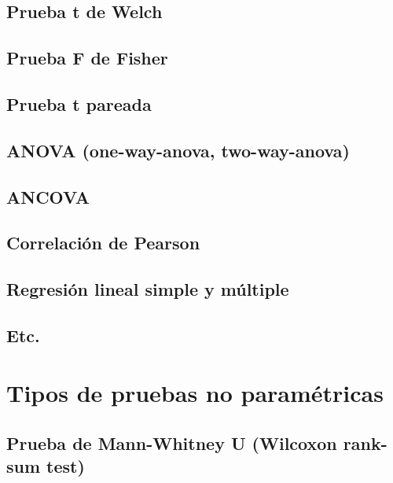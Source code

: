 \documentclass[
]{book}
\begin{document}
\section{Prueba t de Welch}\label{prueba-t-de-welch}

\section{Prueba F de Fisher}\label{prueba-f-de-fisher}

\section{Prueba t pareada}\label{prueba-t-pareada}

\section{ANOVA (one-way-anova, two-way-anova)}\label{anova-one-way-anova-two-way-anova}

\section{ANCOVA}\label{ancova}

\section{Correlación de Pearson}\label{correlaciuxf3n-de-pearson}

\section{Regresión lineal simple y múltiple}\label{regresiuxf3n-lineal-simple-y-muxfaltiple}

\section{Etc.}\label{etc.}

\chapter{Tipos de pruebas no paramétricas}\label{tipos-de-pruebas-no-paramuxe9tricas}

\section{Prueba de Mann-Whitney U (Wilcoxon rank-sum test)}\label{prueba-de-mann-whitney-u-wilcoxon-rank-sum-test}
\end{document}
